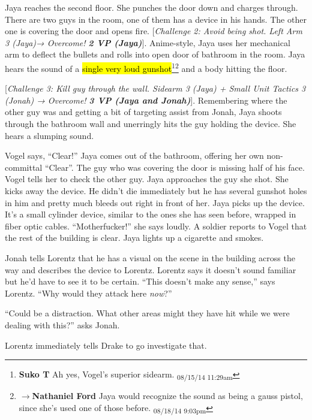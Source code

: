 Jaya reaches the second floor.  She punches the door down and charges through.  There are two guys in the room, one of them has a device in his hands.  The other one is covering the door and opens fire.  {[}\textit{Challenge 2:  Avoid being shot.  Left Arm 3 (Jaya)→ Overcome! }\textit{\textbf{2 VP (Jaya)}}{]}.  Anime-style, Jaya uses her mechanical arm to deflect the bullets and rolls into open door of bathroom in the room.  Jaya hears the sound of a \hl{single very loud gunshot}\footnote{\textbf{Suko T }Ah yes, Vogel's superior sidearm. \textsubscript{08/15/14 11:29am}}\footnote{$\rightarrow$\textbf{Nathaniel Ford }Jaya would recognize the sound as being a gauss pistol, since she's used one of those before. \textsubscript{08/18/14 9:03pm}} and a body hitting the floor.



{[}\textit{Challenge 3: Kill guy through the wall.  Sidearm 3 (Jaya) + Small Unit Tactics 3 (Jonah)  → Overcome! }\textit{\textbf{3 VP (Jaya and Jonah)}}{]}.  Remembering where the other guy was and getting a bit of targeting assist from Jonah, Jaya shoots through the bathroom wall and unerringly hits the guy holding the device.  She hears a slumping sound.



Vogel says, ``Clear!''  Jaya comes out of the bathroom, offering her own non-committal ``Clear''.  The guy who was covering the door is missing half of his face.  Vogel tells her to check the other guy.  Jaya approaches the guy she shot.  She kicks away the device.  He didn't die immediately but he has several gunshot holes in him and pretty much bleeds out right in front of her.  Jaya picks up the device.  It's a small cylinder device, similar to the ones she has seen before, wrapped in fiber optic cables.  ``Motherfucker!'' she says loudly.  A soldier reports to Vogel that the rest of the building is clear.  Jaya lights up a cigarette and smokes.



Jonah tells Lorentz that he has a visual on the scene in the building across the way and describes the device to Lorentz.  Lorentz says it doesn't sound familiar but he'd have to see it to be certain.  ``This doesn't make any sense,'' says Lorentz.  ``Why would they attack here \textit{now}?''

``Could be a distraction.  What other areas might they have hit while we were dealing with this?'' asks Jonah.

Lorentz immediately tells Drake to go investigate that.

